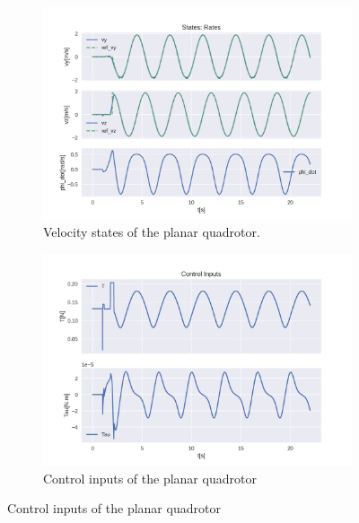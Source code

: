 \documentclass{thesisreport}
\begin{document}
\begin{figure}[H]
\medskip
	\begin{subfigure}{0.48\textwidth}
		\includegraphics[width=\linewidth]{Images/acados_simulations/circular_trajectory/planar_quadrotor/noiseless/rateStates.png}
		\caption{Velocity states of the planar quadrotor.} \label{fig:planar_sim_velocities_noiseless}
	\end{subfigure}\hspace*{\fill}
	\begin{subfigure}{0.48\textwidth}
		\includegraphics[width=\linewidth]{Images/acados_simulations/circular_trajectory/planar_quadrotor/noiseless/controlInputs.png}
		\caption{Control inputs of the planar quadrotor} \label{fig:planar_sim_control_inputs_noiseless}
	\end{subfigure}


\end{figure}
\end{document}
